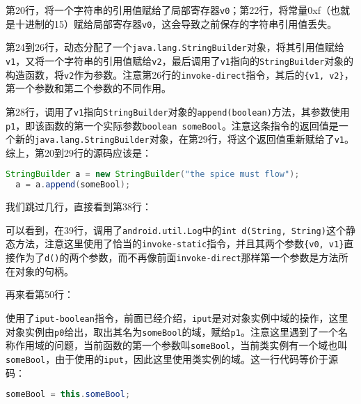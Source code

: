 
第20行，将一个字符串的引用值赋给了局部寄存器\lstinline!v0!；第22行，将常量0xf（也就是十进制的15）赋给局部寄存器\lstinline!v0!，这会导致之前保存的字符串引用值丢失。

第24到26行，动态分配了一个\lstinline!java.lang.StringBuilder!对象，将其引用值赋给\lstinline!v1!，又将一个字符串的引用值赋给\lstinline!v2!，最后调用了\lstinline!v1!指向的\lstinline!StringBuilder!对象的构造函数，将\lstinline!v2!作为参数。注意第26行的\lstinline!invoke-direct!指令，其后的\lstinline!{v1, v2}!，第一个参数和第二个参数的不同作用。


第28行，调用了\lstinline!v1!指向\lstinline!StringBuilder!对象的\lstinline!append(boolean)!方法，其参数使用\lstinline!p1!，即该函数的第一个实际参数\lstinline!boolean someBool!。注意这条指令的返回值是一个新的\lstinline!java.lang.StringBuilder!对象，在第29行，将这个返回值重新赋给了\lstinline!v1!。综上，第20到29行的源码应该是：

\begin{lstlisting}[language=java, numbers=none]
  StringBuilder a = new StringBuilder("the spice must flow");
  a = a.append(someBool);
\end{lstlisting}

我们跳过几行，直接看到第38行：


可以看到，在39行，调用了\lstinline!android.util.Log!中的\lstinline!int d(String, String)!这个静态方法，注意这里使用了恰当的\lstinline!invoke-static!指令，并且其两个参数\lstinline!{v0, v1}!直接作为了\lstinline!d()!的两个参数，而不再像前面\lstinline!invoke-direct!那样第一个参数是方法所在对象的句柄。

再来看第50行：

使用了\lstinline!iput-boolean!指令，前面已经介绍，\lstinline!iput!是对对象实例中域的操作，这里对象实例由\lstinline!p0!给出，取出其名为\lstinline!someBool!的域，赋给\lstinline!p1!。注意这里遇到了一个名称作用域的问题，当前函数的第一个参数叫\lstinline!someBool!，当前类实例有一个域也叫\lstinline!someBool!，由于使用的\lstinline!iput!，因此这里使用类实例的域。这一行代码等价于源码：
\begin{lstlisting}[language=java, numbers=none]
  someBool = this.someBool;
\end{lstlisting}

